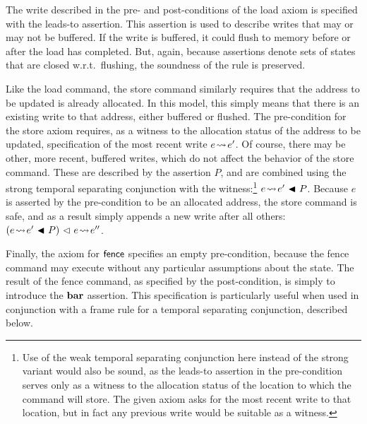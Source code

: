 \documentclass[11pt]{report}         %
\begin{document}
The write described in the pre- and post-conditions of the load axiom is specified with the leads-to assertion. This assertion is used to describe writes that may or may not be buffered. If the write is buffered, it could flush to memory before or after the load has completed. But, again, because assertions denote sets of states that are closed w.r.t.\ flushing, the soundness of the rule is preserved. 

Like the load command, the store command similarly requires that the address to be updated is already allocated. In this model, this simply means that there is an existing write to that address, either buffered or flushed. The pre-condition for the store axiom requires, as a witness to the allocation status of the address to be updated, specification of the most recent write $e \!\leadsto\! e'$. Of course, there may be other, more recent, buffered writes, which do not affect the behavior of the store command. These are described by the assertion $P$, and are combined using the strong temporal separating conjunction with the witness:\footnote{Use of the weak temporal separating conjunction here instead of the strong variant would also be sound, as the leads-to assertion in the pre-condition serves only as a witness to the allocation status of the location to which the command will store. The given axiom asks for the most recent write to that location, but in fact any previous write would be suitable as a witness.} $e \!\leadsto\! e' \operatorname{\,\blacktriangleleft\,} P$. Because $e$ is asserted by the pre-condition to be an allocated address, the store command is safe, and as a result simply appends a new write after all others: $(e \!\leadsto\! e' \operatorname{\,\blacktriangleleft\,} P) \operatorname{\,\vartriangleleft\,} e \!\leadsto\! e''$. 

Finally, the axiom for $\operatorname{\mathsf{fence}}$ specifies an empty pre-condition, because the fence command may execute without any particular assumptions about the state. The result of the fence command, as specified by the post-condition, is simply to introduce the $\mathbf{bar}$ assertion. This specification is particularly useful when used in conjunction with a frame rule for a temporal separating conjunction, described below. 
\end{document}
